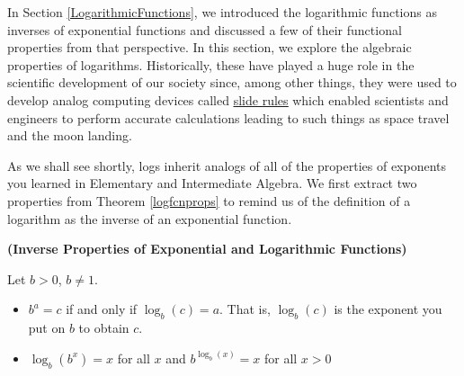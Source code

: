\documentclass{ximera}
\begin{document}
	\author{Stitz-Zeager}




\setcounter{footnote}{0}

\label{PropertiesofLogarithms}

In Section \ref{LogarithmicFunctions}, we introduced the logarithmic functions as inverses of exponential functions and discussed a few of their functional properties from that perspective.  In this section, we explore the algebraic properties of logarithms.  Historically, these have played a huge role in the scientific development of our society since, among other things, they were used to develop analog computing devices called \href{http://en.wikipedia.org/wiki/Slide_rule}{\underline{slide rules}} which enabled scientists and engineers to perform accurate calculations leading to such things as space travel and the moon landing.  



As we shall see shortly, logs inherit analogs of all of the properties of exponents you learned in Elementary and Intermediate Algebra.  We first extract two properties from Theorem \ref{logfcnprops} to remind us of the definition of a logarithm as the inverse of an exponential function.



\begin{theorem}  \label{invpropslogs} \textbf{(Inverse Properties of Exponential and Logarithmic Functions)} 

Let $b > 0$, $b \neq 1$. 

\begin{itemize}

\item   $b^{a} = c$ if and only if $\log_{b}(c) = a$.   That is, $\log_{b}(c)$ is the exponent you put on $b$ to obtain $c$.

\item  $\log_{b} \left(b^{x}\right) = x$ for all $x$ and $b^{\log_{b}(x)} = x$ for all $x > 0$

\end{itemize}

\end{theorem}

\end{document}
